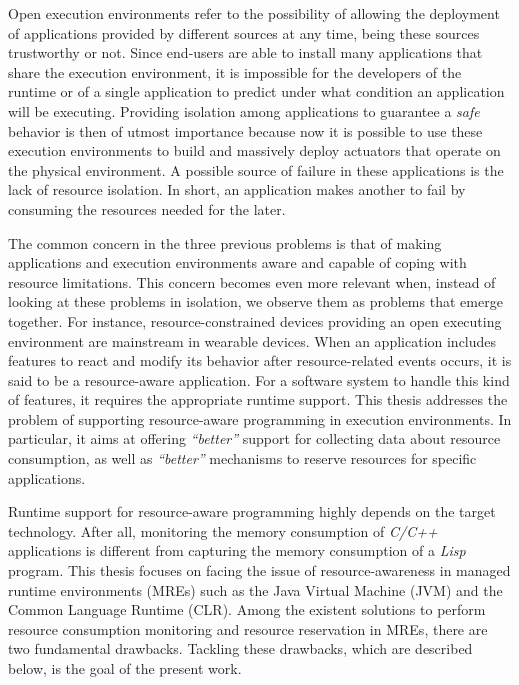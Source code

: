 Open execution environments refer to the possibility of allowing the deployment of applications provided by different sources at any time, being these sources trustworthy or not.
Since end-users are able to install many applications that share the execution environment, it is impossible for the developers of the runtime or of a single application to predict under what condition an application will be executing.
Providing isolation among applications to guarantee a \textit{safe} behavior is then of utmost importance because now it is possible to use these execution environments to build and massively deploy actuators that operate on the physical environment.
A possible source of failure in these applications is the lack of resource isolation.
In short, an application makes another to fail by consuming the resources needed for the later.

The common concern in the three previous problems is that of making applications and execution environments aware and capable of coping with resource limitations.
This concern becomes even more relevant when, instead of looking at these problems in isolation, we observe them as problems that emerge together.
For instance, resource-constrained devices providing an open executing environment are mainstream in wearable devices. 
When an application includes features to react and modify its behavior after resource-related events occurs, it is said to be a resource-aware application.
For a software system to handle this kind of features, it requires the appropriate runtime support.   
This thesis addresses the problem of supporting resource-aware programming in execution environments.
In particular, it aims at offering \textit{``better''} support for collecting data about resource consumption, as well as \textit{``better''} mechanisms to reserve resources for specific applications.

Runtime support for resource-aware programming highly depends on the target technology.
After all, monitoring the memory consumption of \textit{C/C++} applications is different from capturing the memory consumption of a \textit{Lisp} program.
This thesis focuses on facing the issue of resource-awareness in managed runtime environments (MREs) such as the Java Virtual Machine (JVM) and the Common Language Runtime (CLR).
Among the existent solutions to perform resource consumption monitoring and resource reservation in MREs, there are two fundamental drawbacks.
Tackling these drawbacks, which are described below, is the goal of the present work.

